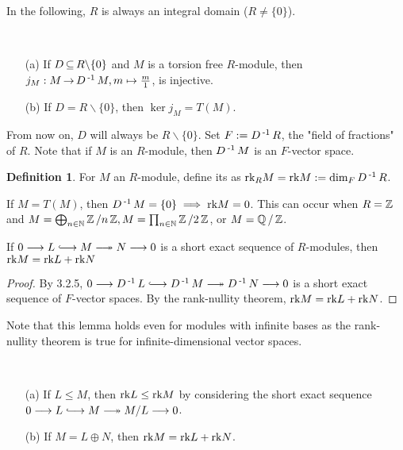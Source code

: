 \documentclass[11pt]{book}
\theoremstyle{definition}   \newtheorem{defn}[counter]{Definition} %
\newcommand{\bs}{\backslash}   \newcommand{\A}{\mathcal{A}}   \newcommand{\sy}{\textnormal{Syl}}   \newcommand{\size}[1]{\left| #1 \right|}
\newcommand{\hooklongrightarrow}{\lhook\joinrel\longrightarrow}   \newcommand{\twoheadlongrightarrow}{\relbar\joinrel\twoheadrightarrow}
\newcommand{\mses}[5]{0 \longrightarrow #1 \overset{#2}{\hooklongrightarrow} #3 \overset{#4}{\twoheadlongrightarrow} #5 \longrightarrow 0}
\DeclareMathOperator{\ra}{\rightarrow}   \DeclareMathOperator{\Poly}{\mathbf{P}}   \DeclareMathOperator{\spn}{\textnormal{span}}   \DeclareMathOperator{\aut}{\textnormal{Aut}}
\newcommand{\vs}{\vspace{8pt}}
\numberwithin{counter}{chapter}
\begin{document}
\vs

In the following, $R$ is always an integral domain ($R \ne \{0\}$).

\vs

\begin{remark}\
\begin{enumerate}
\item[(a)] If $D \sub R \bs \{0\}$ and $M$ is a torsion free $R$-module, then $j_M : M \ra D\inv M, m \mapsto \frac{m}{1}$, is injective.
\item[(b)] If $D = R \bs \{0\}$, then $\ker j_M = T(M)$.
\end{enumerate}
From now on, $D$ will always be $R \bs \{0\}$. Set $F := D\operatorname{^{-1}} R$, the "field of fractions" of $R$. Note that if $M$ is an $R$-module, then $D\operatorname{^{-1}} M$ is an $F$-vector space.
\end{remark}

\vs

\begin{defn}
For $M$ an $R$-module, define its  as $\textnormal{rk}_R M = \textnormal{rk} M := \dim_F D\operatorname{^{-1}} R$.
\begin{example*}
If $M = T(M)$, then $D\operatorname{^{-1}} M = \{0\} \implies \textnormal{rk} M = 0$. This can occur when $R = \operatorname{\mathbb{Z}}$ and $M = \bigoplus_{n \in \operatorname{\mathbb{N}}} \operatorname{\mathbb{Z}}/n\operatorname{\mathbb{Z}}, M = \prod_{n \in \operatorname{\mathbb{N}}} \operatorname{\mathbb{Z}}/2\operatorname{\mathbb{Z}}$, or $M = \operatorname{\mathbb{Q}}/\operatorname{\mathbb{Z}}$.
\end{example*}
\end{defn}

\vs

\begin{lemma}
If $\mses{L}{}{M}{}{N}$ is a short exact sequence of $R$-modules, then $\textnormal{rk}M = \textnormal{rk} L + \textnormal{rk} N$
\end{lemma}

\begin{proof}
By 3.2.5, $\mses{D\inv L}{}{D\inv M}{}{D\inv N}$ is a short exact sequence of $F$-vector spaces. By the rank-nullity theorem, $\textnormal{rk} M = \textnormal{rk} L + \textnormal{rk} N$.
\end{proof}

Note that this lemma holds even for modules with infinite bases as the rank-nullity theorem is true for infinite-dimensional vector spaces.

\vs

\begin{corollary}\
\begin{enumerate}
\item[(a)] If $L \leq M$, then $\textnormal{rk} L \leq \textnormal{rk} M$ by considering the short exact sequence $\mses{L}{}{M}{}{M/L}$.
\item[(b)] If $M = L \oplus N$, then $\textnormal{rk} M = \textnormal{rk} L + \textnormal{rk} N$.
\end{enumerate}
\end{corollary}
\end{document}
